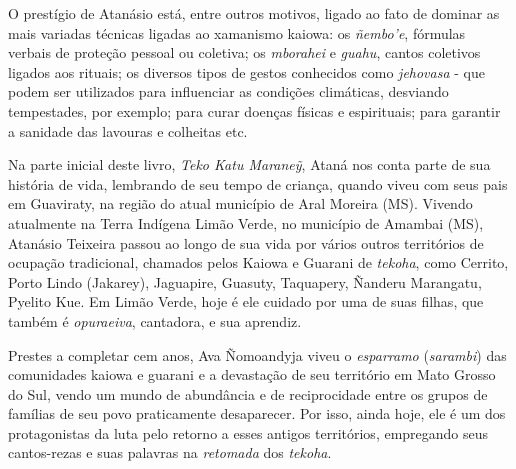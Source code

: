 O prestígio de Atanásio está, entre outros motivos, ligado ao fato de
dominar as mais variadas técnicas ligadas ao xamanismo kaiowa: os
\emph{ñembo'e}, fórmulas verbais de proteção pessoal ou coletiva; os
\emph{mborahei} e \emph{guahu}, cantos coletivos ligados aos rituais; os
diversos tipos de gestos conhecidos como \emph{jehovasa} - que podem ser
utilizados para influenciar as condições climáticas, desviando
tempestades, por exemplo; para curar doenças físicas e espirituais; para
garantir a sanidade das lavouras e colheitas etc.

Na parte inicial deste livro, \emph{Teko Katu Maraneỹ}, Ataná nos conta
parte de sua história de vida, lembrando de seu tempo de criança, quando
viveu com seus pais em Guaviraty, na região do atual município de Aral
Moreira (MS). Vivendo atualmente na Terra Indígena Limão Verde, no
município de Amambai (MS), Atanásio Teixeira passou ao longo de sua vida
por vários outros territórios de ocupação tradicional, chamados pelos
Kaiowa e Guarani de \emph{tekoha}, como Cerrito, Porto Lindo (Jakarey),
Jaguapire, Guasuty, Taquapery, Ñanderu Marangatu, Pyelito Kue. Em Limão
Verde, hoje é ele cuidado por uma de suas filhas, que também é
\emph{opuraeiva}, cantadora, e sua aprendiz.

Prestes a completar cem anos, Ava Ñomoandyja viveu o \emph{esparramo}
(\emph{sarambi}) das comunidades kaiowa e guarani e a devastação de seu
território em Mato Grosso do Sul, vendo um mundo de abundância e de
reciprocidade entre os grupos de famílias de seu povo praticamente
desaparecer. Por isso, ainda hoje, ele é um dos protagonistas da luta
pelo retorno a esses antigos territórios, empregando seus cantos-rezas e
suas palavras na \emph{retomada} dos \emph{tekoha}.

